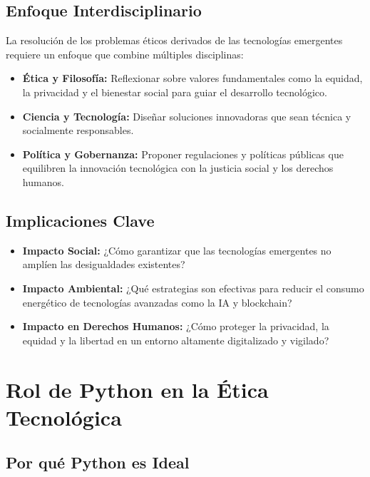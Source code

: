 \begin{refsection}
\subsection{Enfoque Interdisciplinario}

La resolución de los problemas éticos derivados de las tecnologías emergentes requiere un enfoque que combine múltiples disciplinas:

\begin{itemize}
    \item \textbf{Ética y Filosofía:} 
    Reflexionar sobre valores fundamentales como la equidad, la privacidad y el bienestar social para guiar el desarrollo tecnológico.
    
    \item \textbf{Ciencia y Tecnología:} 
    Diseñar soluciones innovadoras que sean técnica y socialmente responsables.
    
    \item \textbf{Política y Gobernanza:} 
    Proponer regulaciones y políticas públicas que equilibren la innovación tecnológica con la justicia social y los derechos humanos.
\end{itemize}

\subsection{Implicaciones Clave}

\begin{itemize}
    \item \textbf{Impacto Social:} 
    ¿Cómo garantizar que las tecnologías emergentes no amplíen las desigualdades existentes?
    
    \item \textbf{Impacto Ambiental:} 
    ¿Qué estrategias son efectivas para reducir el consumo energético de tecnologías avanzadas como la IA y blockchain?
    
    \item \textbf{Impacto en Derechos Humanos:} 
    ¿Cómo proteger la privacidad, la equidad y la libertad en un entorno altamente digitalizado y vigilado?
\end{itemize}

\newpage
\section{Rol de Python en la Ética Tecnológica}

\subsection{Por qué Python es Ideal}


\end{refsection}
